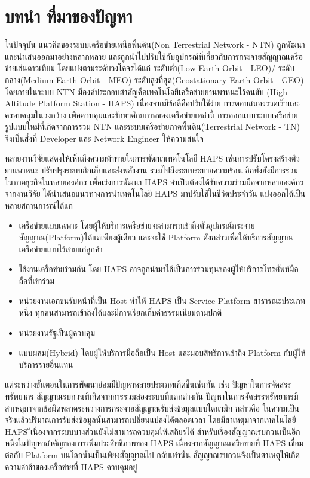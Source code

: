 \section{บทนำ ที่มาของปัญหา}

ในปัจจุบัน แนวคิดของระบบเครือข่ายเหนือพื้นดิน(Non Terrestrial Network - NTN) ถูกพัฒนาและนำเสนออกมาอย่างหลากหลาย
และถูกนำไปปรับใช้กับอุปกรณ์ที่เกี่ยวกับการกระจายสัญญาณเครือข่ายเช่นดาวเทียม โดยแบ่งตามระดับวงโคจรได้แก่ ระดับต่ำ(Low-Earth-Orbit - LEO)/
ระดับกลาง(Medium-Earth-Orbit - MEO) ระดับสูงที่สุด(Geostationary-Earth-Orbit - GEO)
โดยภายในระบบ NTN มีองค์ประกอบสำคัญคือเทคโนโลยีเครือข่ายยานพาหนะไร้คนขับ (High Altitude Platform Station - HAPS)
เนื่องจากมีข้อดีคือปรับใช้ง่าย การตอบสนองรวดเร็วและครอบคลุมในวงกว้าง เพื่อควบคุมและรักษาศักยภาพของเครือข่ายเหล่านี้ 
การออกแบบระบบเครือข่ายรูปแบบใหม่ที่เกิดจากการรวม NTN และระบบเครือข่ายภาคพื้นดิน(Terrestrial Network - TN) 
จึงเป็นสิ่งที่ Developer และ Network Engineer ให้ความสนใจ

หลายงานวิจัยแสดงให้เห็นถึงความท้าทายในการพัฒนาเทคโนโลยี HAPS เช่นการปรับโครงสร้างตัวยานพาหนะ ปรับปรุงระบบกักเก็บและส่งพลังงาน
รวมไปถึงระบบระบายความร้อน อีกทั้งยังมีการร่วมในภาคธุรกิจในหลายองค์กร เพื่อเร่งการพัฒนา HAPS จำเป็นต้องได้รับความร่วมมือจากหลายองค์กร
จากงานวิจัย \cite[High Altitude Platform Systems: Towers in the Skies]{towers} 
ได้นำเสนอแนวทางการนำเทคโนโลยี HAPS มาปรับใช้ในชีวิตประจำวัน แบ่งออกได้เป็นหลายสถานการณ์ได้แก่
\begin{itemize}
    \item เครือข่ายแบบเฉพาะ โดยผู้ให้บริการเครือข่ายจะสามารถเข้าถึงตัวอุปกรณ์กระจายสัญญาณ(Platform)ได้แต่เพียงผู้เดียว 
    และจะใช้ Platform ดังกล่าวเพื่อให้บริการสัญญาณเครือข่ายแบบไร้สายแก่ลูกค้า
    \item ใช้งานเครือข่ายร่วมกัน โดย HAPS อาจถูกนำมาใช้เป็นการร่วมทุนของผู้ให้บริการโทรศัพท์มือถือที่เข้าร่วม
    \item หน่วยงานเอกชนรับหน้าที่เป็น Host ทำให้ HAPS เป็น Service Platform สาธารณะประเภทหนึ่ง
    ทุกคนสามารถเข้าถึงได้และมีการเรียกเก็บค่าธรรมเนียมตามปกติ
    \item หน่วยงานรัฐเป็นผู้ควบคุม
    \item แบบผสม(Hybrid) โดยผู้ให้บริการมือถือเป็น Host และมอบสิทธิการเข้าถึง Platform กับผู้ให้บริการรายอื่นแทน
\end{itemize}
แต่ระหว่างขั้นตอนในการพัฒนาย่อมมีปัญหาหลายประเภทเกิดขึ้นเช่นกัน เช่น ปัญหาในการจัดสรรทรัพยากร 
สัญญาณรบกวนที่เกิดจากการรวมสองระบบที่แตกต่างกัน ปัญหาในการจัดสรรทรัพยากรมีสาเหตุมาจากข้อผิดพลาดระหว่างการกระจายสัญญาณรับส่งข้อมูลแบบไดนามิก 
กล่าวคือ ในความเป็นจริงแล้วปริมาณการรับส่งข้อมูลนั้นสามารถเปลี่ยนแปลงได้ตลอดเวลา โดยมีสาเหตุมาจากเทคโนโลยี HAPS
ีเนื่องจากระบบบางส่วนยังไม่สามารถควบคุมให้เสถียรได้ สำหรับเรื่องสัญญาณรบกวนเป็นอีกหนึ่งในปัญหาสำคัญของการเพิ่มประสิทธิภาพของ HAPS เนื่องจากสัญญาณเครือข่ายที่ HAPS เชื่อมต่อกับ Platform
บนโลกนั้นเป็นเพียงสัญญาณไป-กลับเท่านั้น สัญญาณรบกวนจึงเป็นสาเหตุให้เกิดความล่าช้าของเครือข่ายที่ HAPS ควบคุมอยู่

